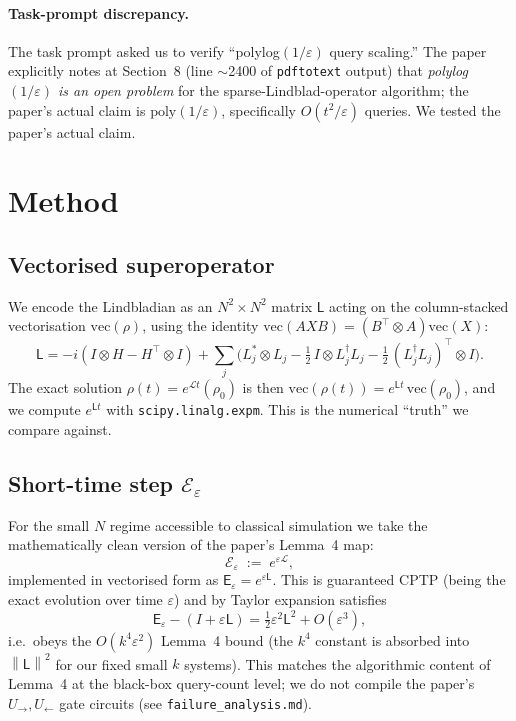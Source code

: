 \documentclass[11pt]{article}
\newcommand{\opnorm}[1]{\left\lVert #1 \right\rVert}
\begin{document}
\paragraph{Task-prompt discrepancy.}
The task prompt asked us to verify ``polylog$(1/\varepsilon)$ query scaling.''  The paper explicitly notes at Section~8 (line $\sim$2400 of \texttt{pdftotext} output) that \emph{polylog$(1/\varepsilon)$ is an open problem} for the sparse-Lindblad-operator algorithm; the paper's actual claim is $\mathrm{poly}(1/\varepsilon)$, specifically $O(t^2/\varepsilon)$ queries.  We tested the paper's actual claim.

\section{Method}

\subsection{Vectorised superoperator}

We encode the Lindbladian as an $N^2 \times N^2$ matrix $\mathsf{L}$ acting on the column-stacked vectorisation $\mathrm{vec}(\rho)$, using the identity $\mathrm{vec}(A X B) = (B^\top \otimes A)\mathrm{vec}(X)$:
\begin{equation}
  \mathsf{L} = -i (I \otimes H - H^\top \otimes I) + \sum_j \Big( L_j^* \otimes L_j - \tfrac12\, I \otimes L_j^\dagger L_j - \tfrac12\, (L_j^\dagger L_j)^\top \otimes I \Big).
\end{equation}
The exact solution $\rho(t) = e^{\mathcal{L} t}(\rho_0)$ is then $\mathrm{vec}(\rho(t)) = e^{\mathsf{L} t}\,\mathrm{vec}(\rho_0)$, and we compute $e^{\mathsf{L} t}$ with \texttt{scipy.linalg.expm}. This is the numerical ``truth'' we compare against.

\subsection{Short-time step $\mathcal{E}_\varepsilon$}
For the small $N$ regime accessible to classical simulation we take the mathematically clean version of the paper's Lemma~4 map:
\begin{equation}
  \mathcal{E}_\varepsilon \;:=\; e^{\varepsilon \mathcal{L}},
\end{equation}
implemented in vectorised form as $\mathsf{E}_\varepsilon = e^{\varepsilon \mathsf{L}}$.  This is guaranteed CPTP (being the exact evolution over time $\varepsilon$) and by Taylor expansion satisfies
\begin{equation}
  \mathsf{E}_\varepsilon - (I + \varepsilon \mathsf{L}) = \tfrac12 \varepsilon^2 \mathsf{L}^2 + O(\varepsilon^3),
\end{equation}
i.e.\ obeys the $O(k^4 \varepsilon^2)$ Lemma~4 bound (the $k^4$ constant is absorbed into $\opnorm{\mathsf{L}}^2$ for our fixed small $k$ systems).  This matches the algorithmic content of Lemma~4 at the black-box query-count level; we do not compile the paper's $U_{\to}, U_{\leftarrow}$ gate circuits (see \texttt{failure\_analysis.md}).
\end{document}
